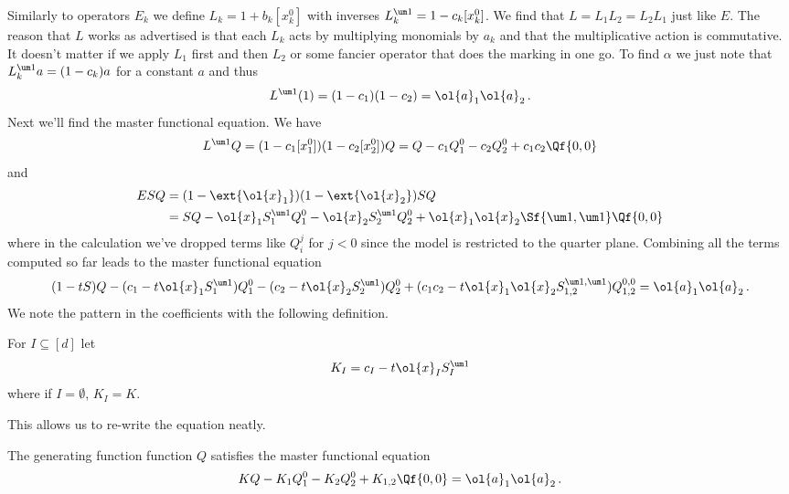 Similarly to operators $E_k$ we define $L_k = 1+ b_k[x_k^0]$ with inverses $L_k^{\um 1} = 1 - c_k[x_k^0]$. We find that $L = L_1L_2 = L_2L_1$ just like $E$. The reason that $L$ works as advertised is that each $L_k$ acts by multiplying monomials by $a_k$ and that the multiplicative action is commutative. It doesn't matter if we apply $L_1$ first and then $L_2$ or some fancier operator that does the marking in one go. To find $\alpha$ we just note that $L_k^{\um 1}a = (1-c_k)a$ for a constant $a$ and thus
\begin{align}
	L^{\um 1}(1) = (1-c_1)(1-c_2) = \ol{a}_1\ol{a}_2\,.
\end{align}
Next we'll find the master functional equation. We have
\begin{align}
	L^{\um 1} Q = (1-c_1[x_1^0])(1-c_2[x_2^0]) Q = Q - c_1 Q_1^0 - c_2 Q_2^0 + c_1c_2 \Qf{0,0}
\end{align}
and
\begin{align}
\begin{split}
	ESQ  &= (1-\ext{\ol{x}_1})(1-\ext{\ol{x}_2})SQ \\
	&= SQ - \ol{x}_1S_1^{\um 1}Q_1^0 - \ol{x}_2S_2^{\um 1}Q_2^0 + \ol{x}_1\ol{x}_2\Sf{\um 1,\um 1}\Qf{0,0}
\end{split}
\end{align}
where in the calculation we've dropped terms like $Q_i^j$ for $j <0$ since the model is restricted to the quarter plane. Combining all the terms computed so far leads to the master functional equation
\begin{align*}
	(1-tS)Q - (c_1-t\ol{x}_1S_1^{\um 1}) Q_1^0- (c_2-t\ol{x}_2S_2^{\um 1}) Q_2^0+ (c_1c_2-t\ol{x}_1\ol{x}_2S_{1,2}^{\um 1,\um 1})Q_{1,2}^{0,0}  = \ol{a}_1\ol{a}_2\,.
\end{align*}
We note the pattern in the coefficients with the following definition.
\begin{definition} For $I \subseteq [d]$ let
\begin{align}
K_I = c_I - t\ol{x}_I S_I^{\um 1}
\end{align}
where if $I = \emptyset$, $K_I = K$.
\end{definition}
This allows us to re-write the equation neatly.
\begin{corollary} The generating function function $Q$ satisfies the master functional equation
\begin{align}
	KQ - K_1 Q_1^0 - K_2 Q_2^0 + K_{1,2} \Qf{0,0} = \ol{a}_1\ol{a}_2\,.
\end{align}
\end{corollary}
